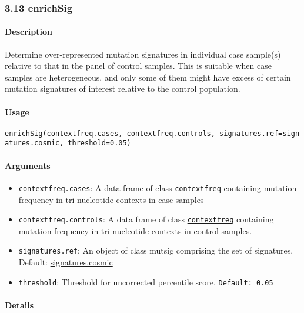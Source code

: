 \documentclass[]{article}
\let\oldparagraph\paragraph
\renewcommand{\paragraph}[1]{\oldparagraph{#1}\mbox{}}
\begin{document}
\subsubsection{3.13 enrichSig}\label{enrichsig}

\paragraph{\texorpdfstring{\textbf{Description}}{Description}}\label{description-10}

Determine over-represented mutation signatures in individual case
sample(s) relative to that in the panel of control samples. This is
suitable when case samples are heterogeneous, and only some of them
might have excess of certain mutation signatures of interest relative to
the control population.

\paragraph{\texorpdfstring{\textbf{Usage}}{Usage}}\label{usage-12}

\texttt{enrichSig(contextfreq.cases,\ contextfreq.controls,\ signatures.ref=signatures.cosmic,\ threshold=0.05)}

\paragraph{\texorpdfstring{\textbf{Arguments
}}{Arguments }}\label{arguments-11}

\begin{itemize}
\item
  \texttt{contextfreq.cases}: A data frame of class
  \protect\hyperlink{contextfreq}{\texttt{contextfreq}} containing
  mutation frequency in tri-nucleotide contexts in case samples
\item
  \texttt{contextfreq.controls}: A data frame of class
  \protect\hyperlink{contextfreq}{\texttt{contextfreq}} containing
  mutation frequency in tri-nucleotide contexts in control samples.
\item
  \texttt{signatures.ref}: An object of class mutsig comprising the set
  of signatures. Default:
  \href{https://cran.r-project.org/web/packages/deconstructSigs/deconstructSigs.pdf}{signatures.cosmic}
\item
  \texttt{threshold}: Threshold for uncorrected percentile score.
  \texttt{Default:\ 0.05}
\end{itemize}

\paragraph{\texorpdfstring{\textbf{Details}}{Details}}\label{details-7}
\end{document}
